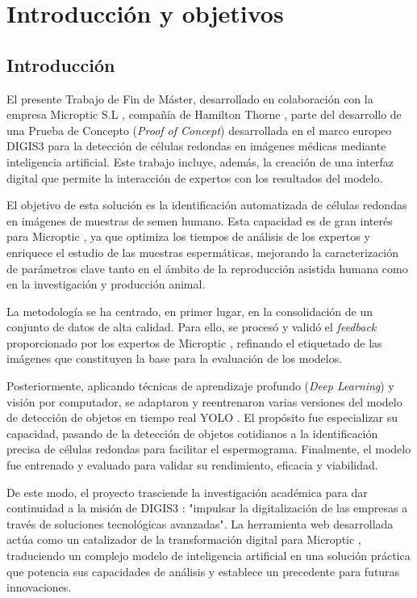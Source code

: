 \documentclass[12pt,a4paper,onecolumn,oneside]{report}
\begin{document}
\chapter{Introducción y objetivos} %
\label{Introducción y objetivos}
\section{Introducción}
\label{sec:Introducción}

El presente Trabajo de Fin de Máster, desarrollado en colaboración con la empresa Microptic S.L \cite{microptic}, compañía de Hamilton Thorne \cite{HamiltonThorneWeb}, 
parte del desarrollo de una Prueba de Concepto (\textit{Proof of Concept}) desarrollada en el marco europeo DIGIS3 \cite{digis3} para la detección de células redondas en imágenes médicas 
mediante inteligencia artificial. Este trabajo incluye, además, la creación de una interfaz digital que permite la interacción de expertos 
con los resultados del modelo.

El objetivo de esta solución es la identificación automatizada de células redondas en imágenes de muestras de semen humano. Esta capacidad es de 
gran interés para Microptic \cite{microptic}, ya que optimiza los tiempos de análisis de los expertos y enriquece el estudio de las muestras espermáticas, 
mejorando la caracterización de parámetros clave tanto en el ámbito de la reproducción asistida humana como en la investigación y producción animal. 

La metodología se ha centrado, en primer lugar, en la consolidación de un conjunto de datos de alta calidad. Para ello, se procesó y validó el \textit{feedback} 
proporcionado por los expertos de Microptic \cite{microptic}, refinando el etiquetado de las imágenes que constituyen la base para la evaluación de los modelos.

Posteriormente, aplicando técnicas de aprendizaje profundo (\textit{Deep Learning}) y visión por computador, se adaptaron y reentrenaron varias versiones 
del modelo de detección de objetos en tiempo real YOLO \cite{ultralytics_models}. El propósito fue especializar su capacidad, pasando de la detección de objetos 
cotidianos a la identificación precisa de células redondas para facilitar el espermograma. Finalmente, el modelo fue entrenado y evaluado 
para validar su rendimiento, eficacia y viabilidad.

De este modo, el proyecto trasciende la investigación académica para dar continuidad a la misión de DIGIS3 \cite{digis3}: "impulsar la digitalización de las empresas a través 
de soluciones tecnológicas avanzadas". La herramienta web desarrollada actúa como un catalizador de la transformación digital para Microptic \cite{microptic}, traduciendo 
un complejo modelo de inteligencia artificial en una solución práctica que potencia sus capacidades de análisis y establece un precedente para futuras innovaciones.
\end{document}
